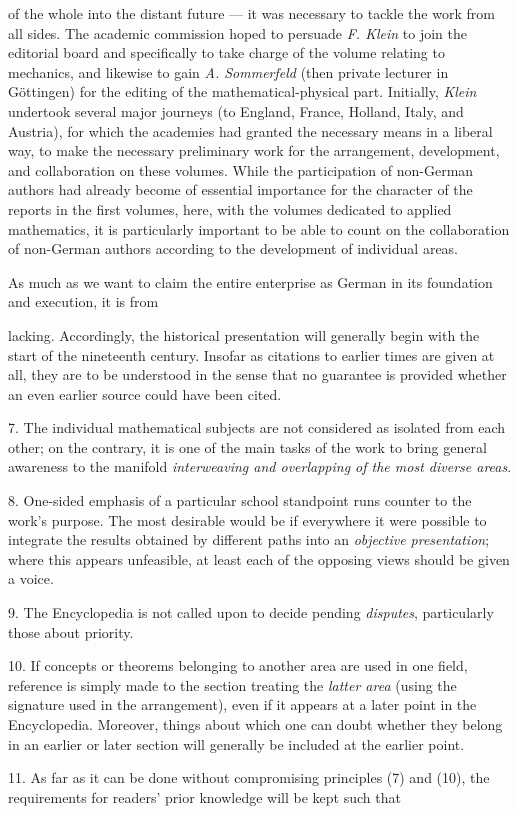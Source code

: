 \thispagestyle{fancy}

\vspace{0.5cm}

of the whole into the distant future — it was necessary to tackle the work from all sides. The academic commission hoped to persuade \textit{F. Klein} to join the editorial board and specifically to take charge of the volume relating to mechanics, and likewise to gain \textit{A. Sommerfeld} (then private lecturer in Göttingen) for the editing of the mathematical-physical part. Initially, \textit{Klein} undertook several major journeys (to England, France, Holland, Italy, and Austria), for which the academies had granted the necessary means in a liberal way, to make the necessary preliminary work for the arrangement, development, and collaboration on these volumes. While the participation of non-German authors had already become of essential importance for the character of the reports in the first volumes, here, with the volumes dedicated to applied mathematics, it is particularly important to be able to count on the collaboration of non-German authors according to the development of individual areas.

As much as we want to claim the entire enterprise as German in its foundation and execution, it is from

\vfill
\leftline{\rule{2in}{0.4pt}}
\vspace{0.2cm}
{\footnotesize 

lacking. Accordingly, the historical presentation will generally begin with the start of the nineteenth century. Insofar as citations to earlier times are given at all, they are to be understood in the sense that no guarantee is provided whether an even earlier source could have been cited.

7. The individual mathematical subjects are not considered as isolated from each other; on the contrary, it is one of the main tasks of the work to bring general awareness to the manifold \textit{interweaving and overlapping of the most diverse areas}.

8. One-sided emphasis of a particular school standpoint runs counter to the work's purpose. The most desirable would be if everywhere it were possible to integrate the results obtained by different paths into an \textit{objective presentation}; where this appears unfeasible, at least each of the opposing views should be given a voice.

9. The Encyclopedia is not called upon to decide pending \textit{disputes}, particularly those about priority.

10. If concepts or theorems belonging to another area are used in one field, reference is simply made to the section treating the \textit{latter area} (using the signature used in the arrangement), even if it appears at a later point in the Encyclopedia. Moreover, things about which one can doubt whether they belong in an earlier or later section will generally be included at the earlier point.

11. As far as it can be done without compromising principles (7) and (10), the requirements for readers' prior knowledge will be kept such that

}
